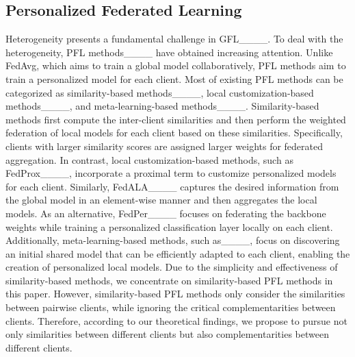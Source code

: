 \subsection{Personalized Federated Learning}
Heterogeneity presents a fundamental challenge in GFL____. To deal with the heterogeneity, PFL methods____ have obtained increasing attention. Unlike FedAvg, which aims to train a global model collaboratively, PFL methods aim to train a personalized model for each client. Most of existing PFL methods can be categorized as similarity-based methods____, local customization-based methods____, and meta-learning-based methods____. Similarity-based methods first compute the inter-client similarities and then perform the weighted federation of local models for each client based on these similarities. Specifically, clients with larger similarity scores are assigned larger weights for federated aggregation. In contrast, local customization-based methods, such as FedProx____, incorporate a proximal term to customize personalized models for each client. Similarly, FedALA____ captures the desired information from the global model in an element-wise manner and then aggregates the local models. As an alternative, FedPer____ focuses on federating the backbone weights while training a personalized classification layer locally on each client. Additionally, meta-learning-based methods, such as____, focus on discovering an initial shared model that can be efficiently adapted to each client, enabling the creation of personalized local models. Due to the simplicity and effectiveness of similarity-based methods, we concentrate on similarity-based PFL methods in this paper. However, similarity-based PFL methods only consider the similarities between pairwise clients, while ignoring the critical complementarities between clients. Therefore, according to our theoretical findings, we propose to pursue not only similarities between different clients but also complementarities between different clients. 

